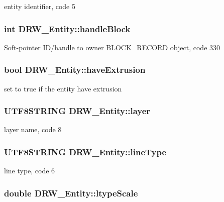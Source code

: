 entity identifier, code 5 \hypertarget{classDRW__Entity_a8be4a86f2b846ecc0723e2b9b5b33f0f}{
\subsubsection[{handle\-Block}]{\setlength{\rightskip}{0pt plus 5cm}int D\-R\-W\-\_\-\-Entity\-::handle\-Block}}\label{classDRW__Entity_a8be4a86f2b846ecc0723e2b9b5b33f0f}
Soft-\/pointer I\-D/handle to owner B\-L\-O\-C\-K\-\_\-\-R\-E\-C\-O\-R\-D object, code 330 \hypertarget{classDRW__Entity_a62545716d4aec61cabb85576afc78dee}{
\subsubsection[{have\-Extrusion}]{\setlength{\rightskip}{0pt plus 5cm}bool D\-R\-W\-\_\-\-Entity\-::have\-Extrusion}}\label{classDRW__Entity_a62545716d4aec61cabb85576afc78dee}
set to true if the entity have extrusion \hypertarget{classDRW__Entity_a65b68c6c8712de3e2fada1d263b96042}{
\subsubsection[{layer}]{\setlength{\rightskip}{0pt plus 5cm}U\-T\-F8\-S\-T\-R\-I\-N\-G D\-R\-W\-\_\-\-Entity\-::layer}}\label{classDRW__Entity_a65b68c6c8712de3e2fada1d263b96042}
layer name, code 8 \hypertarget{classDRW__Entity_a1180883df434a22fdafbc8ac1273e46e}{
\subsubsection[{line\-Type}]{\setlength{\rightskip}{0pt plus 5cm}U\-T\-F8\-S\-T\-R\-I\-N\-G D\-R\-W\-\_\-\-Entity\-::line\-Type}}\label{classDRW__Entity_a1180883df434a22fdafbc8ac1273e46e}
line type, code 6 \hypertarget{classDRW__Entity_a167d107e81c5b2bb4ee015fa62e2fde2}{
\subsubsection[{ltype\-Scale}]{\setlength{\rightskip}{0pt plus 5cm}double D\-R\-W\-\_\-\-Entity\-::ltype\-Scale}}\label{classDRW__Entity_a167d107e81c5b2bb4ee015fa62e2fde2}
